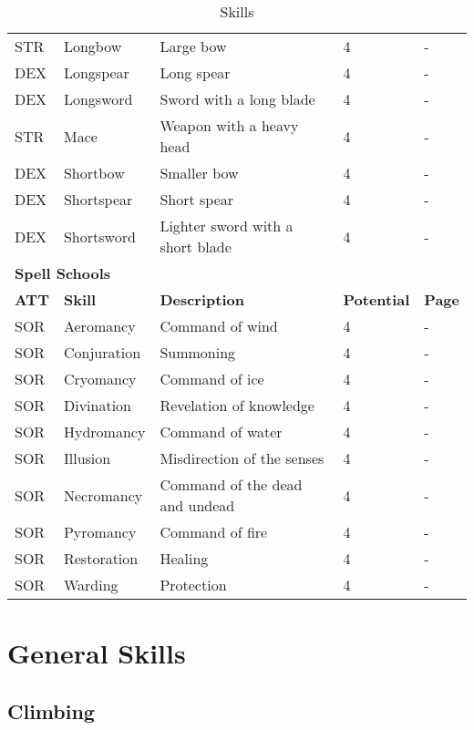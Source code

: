 \begin{multicols*}{2}
\begin{table*}[ht]
\begin{tabularx}{\textwidth}{l l X l l}
            STR & Longbow & Large bow & 4 & - \\ %
            DEX & Longspear & Long spear & 4 & - \\
            DEX & Longsword & Sword with a long blade & 4 & - \\
            STR & Mace & Weapon with a heavy head & 4 & - \\ %
            DEX & Shortbow & Smaller bow & 4 & - \\ %
            DEX & Shortspear & Short spear & 4 & - \\
            DEX & Shortsword & Lighter sword with a short blade & 4 & - \\
            \multicolumn{5}{l}{\bfseries{Spell Schools}} \\
            \bfseries{ATT} & \bfseries{Skill} & \bfseries{Description} & \bfseries{Potential} & \bfseries{Page} \\
            SOR & Aeromancy & Command of wind & 4 & - \\
            SOR & Conjuration & Summoning & 4 & - \\
            SOR & Cryomancy & Command of ice & 4 & - \\
            SOR & Divination & Revelation of knowledge & 4 & - \\
            SOR & Hydromancy & Command of water & 4 & - \\
            SOR & Illusion & Misdirection of the senses & 4 & - \\
            SOR & Necromancy & Command of the dead and undead & 4 & - \\
            SOR & Pyromancy & Command of fire & 4 & - \\
            SOR & Restoration & Healing & 4 & - \\
            SOR & Warding & Protection & 4 & - \\
        \end{tabularx}
        \caption{Skills}
        \label{tab:skills}
    \end{table*}

    \section{General Skills}

    \subsection{Climbing}\label{skill:climbing}


\end{multicols*}
